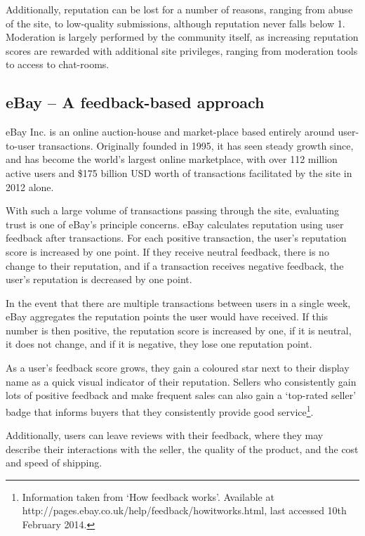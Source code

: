 \documentclass[]{final_report}
\begin{document}
Additionally, reputation can be lost for a number of reasons, ranging from abuse of the site, to low-quality submissions, although reputation never falls below 1. Moderation is largely performed by the community itself, as increasing reputation scores are rewarded with additional site privileges, ranging from moderation tools to access to chat-rooms.


\subsection{eBay -- A feedback-based approach}

eBay Inc. is an online auction-house and market-place based entirely around user-to-user transactions. Originally founded in 1995, it has seen steady growth since, and has become the world's largest online marketplace, with over 112 million active users and \$175 billion USD worth of transactions facilitated by the site in 2012 alone.

With such a large volume of transactions passing through the site, evaluating trust is one of eBay's principle concerns. eBay calculates reputation using user feedback after transactions. For each positive transaction, the user's reputation score is increased by one point. If they receive neutral feedback, there is no change to their reputation, and if a transaction receives negative feedback, the user's reputation is decreased by one point.

In the event that there are multiple transactions between users in a single week, eBay aggregates the reputation points the user would have received. If this number is then positive, the reputation score is increased by one, if it is neutral, it does not change, and if it is negative, they lose one reputation point.

As a user's feedback score grows, they gain a coloured star next to their display name as a quick visual indicator of their reputation. Sellers who consistently gain lots of positive feedback and make frequent sales can also gain a `top-rated seller' badge that informs buyers that they consistently provide good service\footnote{Information taken from `How feedback works'. Available at http://pages.ebay.co.uk/help/feedback/howitworks.html, last accessed 10th February 2014.}.

Additionally, users can leave reviews with their feedback, where they may describe their interactions with the seller, the quality of the product, and the cost and speed of shipping.
\end{document}
